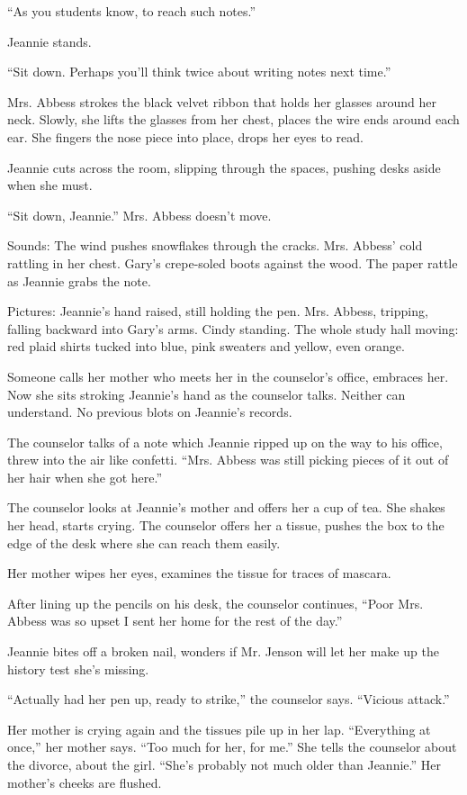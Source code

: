 \documentclass[twoside,10pt]{book}
\begin{document}
``As you students know, to reach such notes.''

Jeannie stands.

``Sit down. Perhaps you'll think twice about writing notes next time.''

Mrs. Abbess strokes the black velvet ribbon that holds her glasses
around her neck. Slowly, she lifts the glasses from her chest, places
the wire ends around each ear. She fingers the nose piece into place,
drops her eyes to read.

Jeannie cuts across the room, slipping through the spaces, pushing desks
aside when she must.

``Sit down, Jeannie.'' Mrs. Abbess doesn't move.

Sounds: The wind pushes snowflakes through the cracks. Mrs. Abbess' cold
rattling in her chest. Gary's crepe-soled boots against the wood. The
paper rattle as Jeannie grabs the note.

Pictures: Jeannie's hand raised, still holding the pen. Mrs. Abbess,
tripping, falling backward into Gary's arms. Cindy standing. The whole
study hall moving: red plaid shirts tucked into blue, pink sweaters and
yellow, even orange.

Someone calls her mother who meets her in the counselor's office,
embraces her. Now she sits stroking Jeannie's hand as the counselor
talks. Neither can understand. No previous blots on Jeannie's records.

The counselor talks of a note which Jeannie ripped up on the way to his
office, threw into the air like confetti. ``Mrs. Abbess was still
picking pieces of it out of her hair when she got here.''

The counselor looks at Jeannie's mother and offers her a cup of tea. She
shakes her head, starts crying. The counselor offers her a tissue,
pushes the box to the edge of the desk where she can reach them easily.

Her mother wipes her eyes, examines the tissue for traces of mascara.

After lining up the pencils on his desk, the counselor continues, ``Poor
Mrs. Abbess was so upset I sent her home for the rest of the day.''

Jeannie bites off a broken nail, wonders if Mr. Jenson will let her make
up the history test she's missing.

``Actually had her pen up, ready to strike,'' the counselor says.
``Vicious attack.''

Her mother is crying again and the tissues pile up in her lap.
``Everything at once,'' her mother says. ``Too much for her, for me.''
She tells the counselor about the divorce, about the girl. ``She's
probably not much older than Jeannie.'' Her mother's cheeks are flushed.
\end{document}
